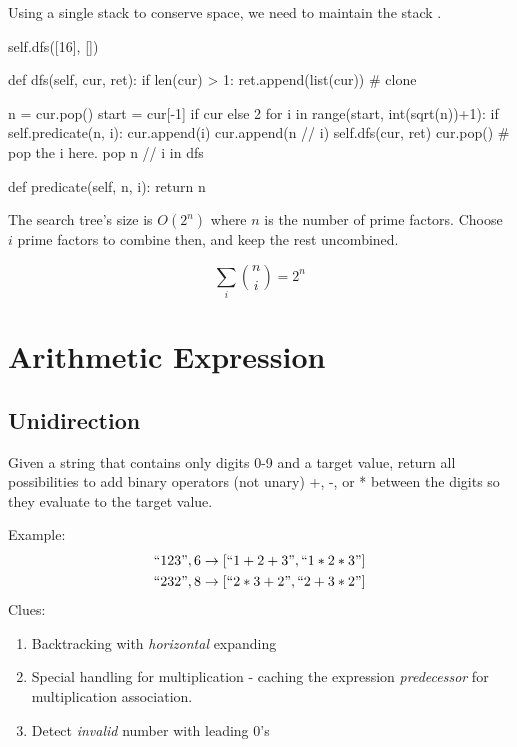 Using a single stack to conserve space, we need to maintain the stack . 
\begin{python}
self.dfs([16], [])

def dfs(self, cur, ret):
  if len(cur) > 1:
    ret.append(list(cur))  # clone 

  n = cur.pop()
  start = cur[-1] if cur else 2
  for i in range(start, int(sqrt(n))+1):
    if self.predicate(n, i):
      cur.append(i)
      cur.append(n // i)
      self.dfs(cur, ret)
      cur.pop()  # pop the i here. pop n // i in dfs
            
def predicate(self, n, i):
  return n %
  
\end{python}
 The search tree's size is $O(2^n)$ where $n$ is the number
of prime factors. Choose $i$ prime factors to combine then, and keep the rest uncombined.


$$\sum_i {n \choose i} = 2^n$$

\section{Arithmetic Expression}
\subsection{Unidirection}
 Given a string that contains only digits 0-9 and a target value,
return all possibilities to add binary operators (not unary) +, -, or * between the
digits so they evaluate to the target value.

Example: 
\begin{align*}
``123", 6 \rightarrow [``1+2+3", ``1*2*3"] \\ 
``232", 8 \rightarrow [``2*3+2", ``2+3*2"] \\
\end{align*}
Clues:
\begin{enumerate}
\item Backtracking with \textit{horizontal} expanding
\item Special handling for multiplication - caching the expression \textit{predecessor}
for multiplication association. 
\item Detect \textit{invalid} number with leading 0's
\end{enumerate}

